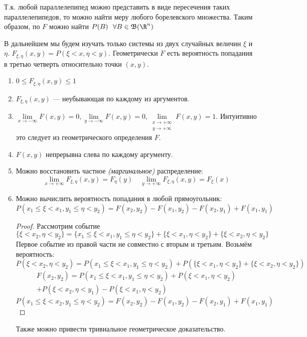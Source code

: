 Т.к. любой параллелепипед можно представить в виде пересечения таких параллелепипедов, то можно найти меру любого борелевского множества. Таким образом, по \(F\) можно найти \(P(B) \ \ \forall B \in \mathfrak{B}(\R^n)\)

\begin{remark}
    В дальнейшем мы будем изучать только системы из двух случайных величин \(\xi\) и \(\eta\). \(F_{\xi, \eta}(x, y) = P(\xi < x, \eta < y)\). Геометрически \(F\) есть вероятность попадания в третью четверть относительно точки \((x, y)\).
\end{remark}

\begin{prop}\itemfix
    \begin{enumerate}
        \item \(0 \leq F_{\xi, \eta} (x, y) \leq 1\)
        \item \(F_{\xi, \eta} (x, y)\) --- неубывающая по каждому из аргументов.
        \item \(\lim\limits_{x \to -\infty} F(x, y) = 0, \lim\limits_{y \to -\infty} F(x, y) = 0, \lim\limits_{\substack{x \to +\infty \\ y \to +\infty}} F(x, y) = 1\). Интуитивно это следует из геометрического определения \(F\).
        \item \(F(x, y)\) непрерывна слева по каждому аргументу.
        \item Можно восстановить частное \textit{(маргинальное)} распределение:
              \[\lim_{x \to +\infty} F_{\xi, \eta}(x, y) = F_\eta(y) \quad \lim_{y \to +\infty} F_{\xi, \eta}(x, y) = F_\xi(x)\]
        \item Можно вычислить вероятность попадания в любой прямоугольник:
              \[P(x_1 \leq \xi < x_1, y_1 \leq \eta < y_2) = F(x_2, y_2) - F(x_1, y_2) - F(x_2, y_1) + F(x_1, y_1)\]
              \begin{proof}
                  Рассмотрим событие
                  \[\{\xi < x_2, \eta < y_2\} = \{x_1 \leq \xi < x_1, y_1 \leq \eta < y_2\} + \{\xi < x_1, \eta < y_2\} + \{\xi < x_2, \eta < y_2\}\]
                  Первое событие из правой части не совместно с вторым и третьим. Возьмём вероятность:
                  \[P(\xi < x_2, \eta < y_2) = P(x_1 \leq \xi < x_1, y_1 \leq \eta < y_2) + P(\{\xi < x_1, \eta < y_2\} + \{\xi < x_2, \eta < y_2\})\]
                  \begin{multline}
                      F(x_2, y_2) = P(x_1 \leq \xi < x_1, y_1 \leq \eta < y_2) + P(\xi < x_1, \eta < y_2) \\
                      + P(\xi < x_2, \eta < y_1) - P(\xi < x_1, \eta < y_2)
                  \end{multline}
                  \[P(x_1 \leq \xi < x_2, y_1 \leq \eta < y_2) = F(x_2, y_2) - F(x_1, y_2) - F(x_2, y_1) + F(x_1, y_1)\]
              \end{proof}

              Также можно привести тривиальное геометрическое доказательство.
    \end{enumerate}
\end{prop}

